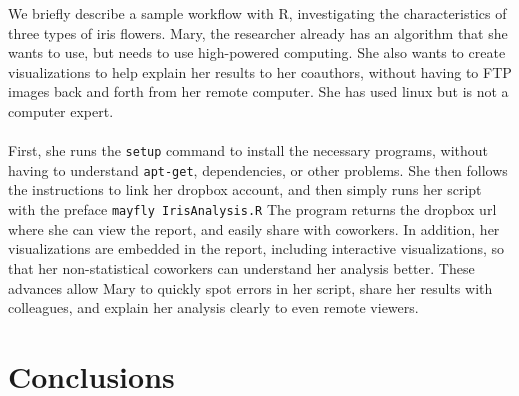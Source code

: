 \documentclass[10pt,a4]{article}
\begin{document}
We briefly describe a sample workflow with R, investigating the characteristics of three types of iris flowers. Mary, the researcher already has an algorithm that she wants to use, but needs to use high-powered computing. She also wants to create visualizations to help explain her results to her coauthors, without having to FTP images back and forth from her remote computer. She has used linux but is not a computer expert.
\\ \\
First, she runs the \texttt{setup} command to install the necessary programs, without having to understand \texttt{apt-get}, dependencies, or other problems. She then follows the instructions to link her dropbox account, and then simply runs her script with the preface \texttt{mayfly IrisAnalysis.R}  The program returns the dropbox url where she can view the report, and easily share with coworkers. In addition, her visualizations are embedded in the report, including interactive visualizations, so that her non-statistical coworkers can understand her analysis better. These advances allow Mary to quickly spot errors in her script, share her results with colleagues, and explain her analysis clearly to even remote viewers. 

\section{Conclusions}
\end{document}
